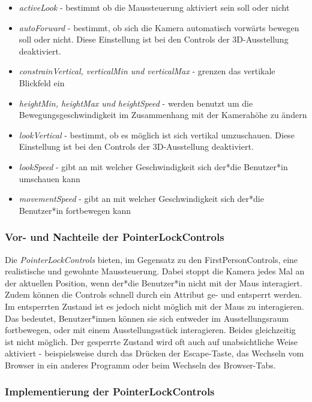 \begin{itemize}
    \item \emph{activeLook} - bestimmt ob die Maussteuerung aktiviert sein soll oder nicht
    \item \emph{autoForward} - bestimmt, ob sich die Kamera automatisch vorwärts bewegen soll oder nicht. Diese Einstellung ist bei den Controls der 3D-Ausstellung deaktiviert.
    \item \emph{constrainVertical, verticalMin und verticalMax} - grenzen das vertikale Blickfeld ein
    \item \emph{heightMin, heightMax und heightSpeed} - werden benutzt um die Bewegungsgeschwindigkeit im Zusammenhang mit der Kamerahöhe zu ändern
    \item \emph{lookVertical} - bestimmt, ob es möglich ist sich vertikal umzuschauen. Diese Einstellung ist bei den Controls der 3D-Ausstellung deaktiviert.
    \item \emph{lookSpeed} - gibt an mit welcher Geschwindigkeit sich der*die Benutzer*in umschauen kann
    \item \emph{movementSpeed} - gibt an mit welcher Geschwindigkeit sich der*die Benutzer*in fortbewegen kann
\end{itemize}
\cite{FirstPersonControls}

\subsubsection{Vor- und Nachteile der PointerLockControls}

Die \emph{PointerLockControls} bieten, im Gegensatz zu den FirstPersonControls, eine realistische und gewohnte Maussteuerung. Dabei stoppt die Kamera jedes Mal an der aktuellen Position, wenn der*die Benutzer*in nicht mit der Maus interagiert. Zudem können die Controls schnell durch ein Attribut ge- und entsperrt werden. Im entsperrten Zustand ist es jedoch nicht möglich mit der Maus zu interagieren. Das bedeutet, Benutzer*innen können sie sich entweder im Ausstellungsraum fortbewegen, oder mit einem Ausstellungsstück interagieren. Beides gleichzeitig ist nicht möglich. Der gesperrte Zustand wird oft auch auf unabsichtliche Weise aktiviert - beispielsweise durch das Drücken der Escape-Taste, das Wechseln vom Browser in ein anderes Programm oder beim Wechseln des Browser-Tabs.  

\subsubsection{Implementierung der PointerLockControls}

